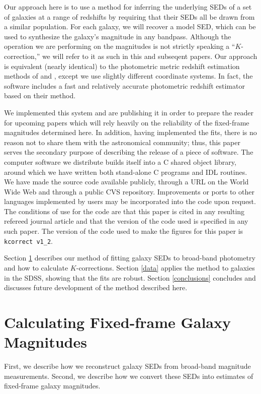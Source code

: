 \documentclass[10pt,preprint]{aastex}
\begin{document}
Our approach here is to use a method for inferring the underlying SEDs
of a set of galaxies at a range of redshifts by requiring that their
SEDs all be drawn from a similar population. For each galaxy, we will
recover a model SED, which can be used to synthesize the galaxy's
magnitude in any bandpass. Although the operation we are performing on
the magnitudes is not strictly speaking a ``$K$-correction,'' we will
refer to it as such in this and subseqent papers. Our approach is
equivalent (nearly identical) to the photometric metric redshift
estimation methods of \citet{csabai00a} and \citet{budavari00a},
except we use slightly different coordinate systems. In fact, the
software includes a fast and relatively accurate photometric redshift
estimator based on their method.

We implemented this system and are publishing it in order to prepare
the reader for upcoming papers which will rely heavily on the
reliability of the fixed-frame magnitudes determined here.  In
addition, having implemented the fits, there is no reason not to share
them with the astronomical community; thus, this paper serves the
secondary purpose of describing the release of a piece of
software. The computer software we distribute builds itself into a C
shared object library, around which we have written both stand-alone C
programs and IDL routines. We have made the source code available
publicly, through a URL on the World Wide Web and through a public CVS
repository. Improvements or ports to other languages implemented by
users may be incorporated into the code upon request. The conditions
of use for the code are that this paper is cited in any resulting
refereed journal article and that the version of the code used is
specified in any such paper. The version of the code used to make the
figures for this paper is {\tt kcorrect v1\_2}.

Section \ref{sedfit} describes our method of fitting galaxy SEDs to
broad-band photometry and how to calculate $K$-corrections. Section
\ref{data} applies the method to galaxies in the SDSS, showing that
the fits are robust.  Section \ref{conclusions} concludes and
discusses future development of the method described here.

\section{Calculating Fixed-frame Galaxy Magnitudes}
\label{sedfit}

First, we describe how we reconstruct galaxy SEDs from broad-band
magnitude measurements. Second, we describe how we convert these SEDs
into estimates of fixed-frame galaxy magnitudes. 
\end{document}
